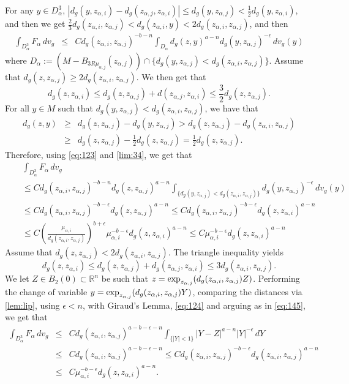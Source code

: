 \documentclass[reqno]{amsart}
\def \rn {\mathbb{R}^n}
\def \eps {\epsilon}
\def \mai {\mu_{\alpha,i}}
\def \maj {\mu_{\alpha,j}}
\def \zai {z_{\alpha,i}}
\def \zaj {z_{\alpha,j}}
\begin{document}
\smallskip\noindent For any $y\in D_\alpha^3$, $|d_g(y,\zai)-d_g(\zaj,\zai)|\leq d_g(y,\zaj)<\frac{1}{2}d_g(y,\zai)$, and then we get $\frac{2}{3}d_g(\zai,\zaj)<d_g(\zai,y)<2d_g(\zai,\zaj)$, and then
\begin{eqnarray*} \int_{D_\alpha^3}F_\alpha \, dv_g&\leq & C d_g(\zai,\zaj)^{-b-n} \int_{D_\alpha} d_g(z,y)^{a-n}d_g(y,\zaj)^{-\eps}\, dv_g(y)
\end{eqnarray*}
where $D_\alpha:=\left(M- B_{3R\maj}(\zaj)\right)\cap\{d_g(y,\zaj)< d_g(\zai,\zaj)\}$. Assume that $d_g(z,\zaj)\geq 2 d_g(\zai,\zaj)$. We then get that
\begin{equation}\label{eq:123}
d_g(z, \zai)\leq d_g(z,\zaj)+d(\zaj,\zai)\leq \frac{3}{2}d_g(z,\zaj).
\end{equation}
For all $y\in M$ such that $d_g(y,\zaj)< d_g(\zai,\zaj)$, we have that 
\begin{eqnarray*}
d_g(z,y)&\geq& d_g(z,\zaj)-d_g(y,\zaj)>d_g(z,\zaj)- d_g(\zai,\zaj)\\
&\geq& d_g(z,\zaj)-\frac{1}{2}d_g(z,\zaj)=\frac{1}{2}d_g(z,\zaj).
\end{eqnarray*}
Therefore, using \eqref{eq:123} and  \eqref{lim:34}, we get that 
\begin{eqnarray} 
&&\int_{D_\alpha^3}F_\alpha \, dv_g\nonumber\\
&&\leq  C d_g(\zai,\zaj)^{-b-n} d_g(z,\zaj)^{a-n}\int_{ \{d_g(y,\zaj)< d_g(\zai,\zaj)\}} d_g(y,\zaj)^{-\eps}\, dv_g(y)\nonumber\\
&&\leq C d_g(\zai,\zaj)^{-b-\eps} d_g(z,\zaj)^{a-n}\leq C  d_g(\zai,\zaj)^{-b-\eps} d_g(z,\zai)^{a-n}\nonumber\\
&&\leq  C   \left(\frac{\mai}{d_g(\zai,\zaj)}\right)^{b+\eps}\mai^{-b-\eps} d_g(z,\zai)^{a-n}\leq C\mai^{-b-\eps} d_g(z,\zai)^{a-n}\label{eq:145}
\end{eqnarray}
Assume that $d_g(z,\zaj)<2 d_g(\zai,\zaj)$. The triangle inequality yields
\begin{equation}\label{eq:124}
d_g(z,\zai)\leq d_g(z,\zaj)+d_g(\zaj,\zai)\leq 3 d_g(\zai,\zaj).
\end{equation}
We let $Z\in B_2(0)\subset\rn$ be such that $z=\hbox{exp}_{\zaj}(d_g(\zai,\zaj)Z)$. Performing the change of variable $y=\hbox{exp}_{\zaj}(d_g(\zai,\zaj)Y)$, comparing the distances via \eqref{lem:lip}, using $\eps<n$,  with Giraud's Lemma, \eqref{eq:124} and arguing as in \eqref{eq:145}, we get that
\begin{eqnarray*} \int_{D_\alpha^3}F_\alpha \, dv_g&\leq & C d_g(\zai,\zaj)^{a-b-\eps-n} \int_{\{|Y|< 1 \}} |Y-Z|^{a-n}|Y|^{-\eps}\, dY\\
&\leq & C d_g(\zai,\zaj)^{a-b-\eps-n} \leq C  d_g(\zai,\zaj)^{-b-\eps}  d_g(\zai,\zaj)^{a -n}\\
&\leq & C\mai^{-b-\eps} d_g(z,\zai)^{a-n}.
\end{eqnarray*}
\end{document}
